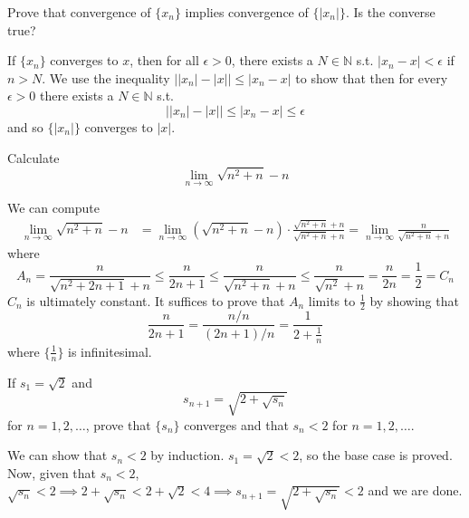   \begin{exercise}
    Prove that convergence of $\{x_n\}$ implies convergence of $\{|x_n|\}$. Is the converse true? 
  \end{exercise}
  \begin{solution}
    If $\{x_n\}$ converges to $x$, then for all $\epsilon > 0$, there exists a $N \in \mathbb{N}$ s.t. $|x_n - x| < \epsilon$ if $n > N$. We use the inequality $\big| |x_n| - |x| \big| \leq |x_n - x|$ to show that then for every $\epsilon > 0$ there exists a $N \in \mathbb{N}$ s.t. 
    \[ \big| |x_n| - |x| \big| \leq |x_n - x| \leq \epsilon \]
    and so $\{|x_n|\}$ converges to $|x|$. 
  \end{solution}

  \begin{exercise}
    Calculate 
    \[\lim_{n \rightarrow \infty} \sqrt{n^2 + n} - n\]
  \end{exercise}
  \begin{solution}
    We can compute  
    \begin{align*}
        \lim_{n \rightarrow \infty} \sqrt{n^2 + n} - n & = \lim_{n \rightarrow \infty} (\sqrt{n^2 + n} - n) \cdot \frac{\sqrt{n^2 + n} + n}{\sqrt{n^2 + n} + n} = \lim_{n \rightarrow \infty} \frac{n}{\sqrt{n^2 + n} + n}
    \end{align*}
    where 
    \[A_n = \frac{n}{\sqrt{n^2 + 2n + 1} + n} \leq \frac{n}{2n + 1} \leq \frac{n}{\sqrt{n^2 + n} + n} \leq \frac{n}{\sqrt{n^2} + n} = \frac{n}{2n} = \frac{1}{2} = C_n\]
    $C_n$ is ultimately constant. It suffices to prove that $A_n$ limits to $\frac{1}{2}$ by showing that 
    \[\frac{n}{2n + 1} = \frac{n/n}{(2n+1)/n} = \frac{1}{2 + \frac{1}{n}}\]
    where $\{\frac{1}{n}\}$ is infinitesimal. 
  \end{solution}

  \begin{exercise}[Rudin 3.3]
    If $s_1 = \sqrt{2}$ and 
    \[s_{n+1} = \sqrt{2 + \sqrt{s_n}}\]
    for $n = 1, 2, \ldots$, prove that $\{s_n\}$ converges and that $s_n < 2$ for $n = 1, 2, \ldots$. 
  \end{exercise}
  \begin{solution}
    We can show that $s_n < 2$ by induction. $s_1 = \sqrt{2} < 2$, so the base case is proved. Now, given that $s_n < 2$, $\sqrt{s_n} < 2 \implies 2 + \sqrt{s_n} < 2 + \sqrt{2} < 4 \implies s_{n+1} = \sqrt{2 + \sqrt{s_n}} < 2$ and we are done. 
  \end{solution}

  \begin{exercise}[Rudin 3.4]

  \end{exercise}

